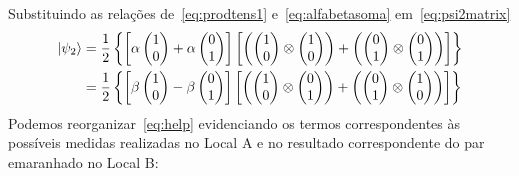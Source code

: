 Substituindo as relações de~\eqref{eq:prodtens1} e~\eqref{eq:alfabetasoma} em~\eqref{eq:psi2matrix}
\begin{equation}\label{eq:help}
  \begin{split}
\ket{\psi_2} &= \frac{1}{2}\left\{\left[\alpha\begin{pmatrix}
1 \\
0
\end{pmatrix}+\alpha\begin{pmatrix}
0 \\
1
\end{pmatrix}\right]\left[\left(\begin{pmatrix}
1 \\
0
\end{pmatrix} \otimes \begin{pmatrix}
1 \\
0
\end{pmatrix}\right) + \left(\begin{pmatrix}
0 \\
1
\end{pmatrix} \otimes \begin{pmatrix}
0 \\
1
\end{pmatrix}\right)\right]\right\} \nonumber \\
&= \frac{1}{2}\left\{\left[\beta\begin{pmatrix}
1 \\
0
\end{pmatrix}-\beta\begin{pmatrix}
0 \\
1
\end{pmatrix}\right]\left[\left(\begin{pmatrix}
1 \\
0
\end{pmatrix} \otimes \begin{pmatrix}
0 \\
1
\end{pmatrix}\right) + \left(\begin{pmatrix}
0 \\
1
\end{pmatrix} \otimes \begin{pmatrix}
1 \\
0
\end{pmatrix}\right)\right]\right\}
  \end{split}
\end{equation}
Podemos reorganizar~\eqref{eq:help} evidenciando os termos correspondentes às possíveis medidas realizadas no Local A e no resultado correspondente do par emaranhado no Local B:
